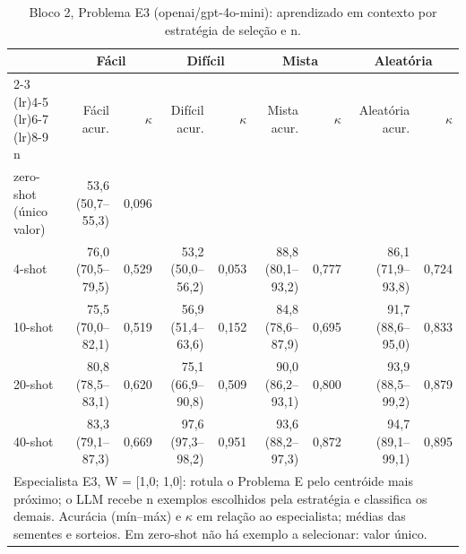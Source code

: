 \begin{table}[htbp]
\centering
\small
\caption{Bloco 2, Problema E3 (openai/gpt-4o-mini): aprendizado em contexto por estratégia de seleção e n.}
\label{tab:bloco2_E3_faseE_estrategia_x_nshot_gpt4mini}
\begin{tabular}{lrrrrrrrr}
\toprule
 & \multicolumn{2}{c}{Fácil} & \multicolumn{2}{c}{Difícil} & \multicolumn{2}{c}{Mista} & \multicolumn{2}{c}{Aleatória} \\ \cmidrule(lr){2-3} \cmidrule(lr){4-5} \cmidrule(lr){6-7} \cmidrule(lr){8-9}
n & Fácil acur. & $\kappa$ & Difícil acur. & $\kappa$ & Mista acur. & $\kappa$ & Aleatória acur. & $\kappa$ \\
\midrule
zero-shot (único valor) & 53,6 (50,7–55,3) & 0,096 &  &  &  &  &  &  \\
4-shot & 76,0 (70,5–79,5) & 0,529 & 53,2 (50,0–56,2) & 0,053 & 88,8 (80,1–93,2) & 0,777 & 86,1 (71,9–93,8) & 0,724 \\
10-shot & 75,5 (70,0–82,1) & 0,519 & 56,9 (51,4–63,6) & 0,152 & 84,8 (78,6–87,9) & 0,695 & 91,7 (88,6–95,0) & 0,833 \\
20-shot & 80,8 (78,5–83,1) & 0,620 & 75,1 (66,9–90,8) & 0,509 & 90,0 (86,2–93,1) & 0,800 & 93,9 (88,5–99,2) & 0,879 \\
40-shot & 83,3 (79,1–87,3) & 0,669 & 97,6 (97,3–98,2) & 0,951 & 93,6 (88,2–97,3) & 0,872 & 94,7 (89,1–99,1) & 0,895 \\
\bottomrule
\multicolumn{9}{p{0.95\linewidth}}{\footnotesize Especialista E3, W = [1,0; 1,0]: rotula o Problema E pelo centróide mais próximo; o LLM recebe n exemplos escolhidos pela estratégia e classifica os demais. Acurácia (mín–máx) e $\kappa$ em relação ao especialista; médias das sementes e sorteios. Em zero-shot não há exemplo a selecionar: valor único.} \\
\end{tabular}
\end{table}
